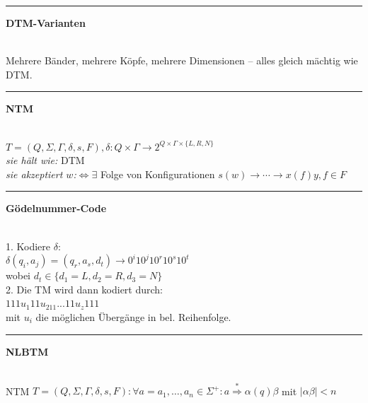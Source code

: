 \documentclass{article}
\newcommand{\hh}[1]{{\vspace{1pt}\hrule\vspace{1pt} \noindent\textbf{#1}}\\}
\newcommand{\hhh}[1]{{\vspace{1pt}\noindent\emph{#1:}}}
\begin{document}
\begin{multicols}{4}
\hh{DTM-Varianten}
Mehrere Bänder, mehrere Köpfe, mehrere Dimensionen -- alles gleich mächtig wie DTM.

\hh{NTM}
$T=(Q, \Sigma, \Gamma, \delta, s, F ), \delta: Q\times\Gamma\to 2^{Q\times\Gamma\times\{L, R, N\}}$\\
\hhh{sie hält wie} DTM\\
\hhh{sie akzeptiert $w$}$\Leftrightarrow\exists$ Folge von Konfigurationen $s(w)\to\cdots\to x(f)y, f\in F$\\ 

\hh{Gödelnummer-Code}
1. Kodiere $\delta$: \\
$\delta(q_i,a_j)=(q_r,a_s,d_t) \to 0^i10^j10^r10^s10^t$ \\
wobei $d_t\in \{d_1=L, d_2=R, d_3=N\}$ \\
2. Die TM wird dann kodiert durch: \\
			$111u_1 11u_211...11u_z111$ \\
			mit $u_i$ die möglichen Übergänge in bel. Reihenfolge. \\

\hh{NLBTM}
NTM $T=(Q, \Sigma, \Gamma, \delta, s, F): \forall a=a_1,\ldots, a_n\in\Sigma^+:a\stackrel{*}{\Rightarrow}\alpha(q)\beta$ mit $|\alpha\beta|<n$


\end{multicols}
\end{document}

